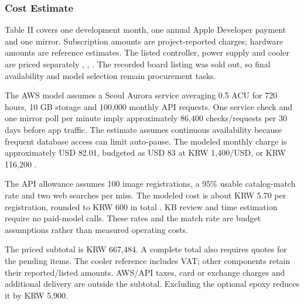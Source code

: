 \documentclass[conference,letterpaper]{IEEEtran}
\begin{document}
\subsubsection*{Cost Estimate}

Table II covers one development month, one annual Apple Developer payment and one mirror. Subscription amounts are project-reported charges; hardware amounts are reference estimates. The listed controller, power supply and cooler are priced separately \cite{ref8}, \cite{ref9}, \cite{ref10}. The recorded board listing was sold out, so final availability and model selection remain procurement tasks.

The AWS model assumes a Seoul Aurora service averaging 0.5 ACU for 720 hours, 10 GB storage and 100,000 monthly API requests. One service check and one mirror poll per minute imply approximately 86,400 checks/requests per 30 days before app traffic. The estimate assumes continuous availability because frequent database access can limit auto-pause. The modeled monthly charge is approximately USD 82.01, budgeted as USD 83 at KRW 1,400/USD, or KRW 116,200 \cite{ref11}.

The API allowance assumes 100 image registrations, a 95\% usable catalog-match rate and two web searches per miss. The modeled cost is about KRW 5.70 per registration, rounded to KRW 600 in total \cite{ref12}. KB review and time estimation require no paid-model calls. These rates and the match rate are budget assumptions rather than measured operating costs.

The priced subtotal is KRW 667,484. A complete total also requires quotes for the pending items. The cooler reference includes VAT; other components retain their reported/listed amounts. AWS/API taxes, card or exchange charges and additional delivery are outside the subtotal. Excluding the optional epoxy reduces it by KRW 5,900.
\end{document}
